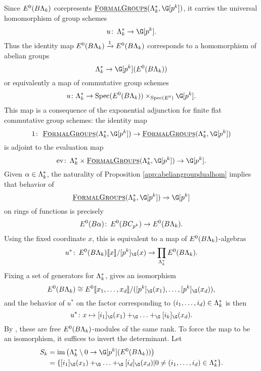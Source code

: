 Since $E^0(B\Lambda_k)$ corepresents $\InternalHom{FormalGroups}(\Lk^*,\G[p^k])$, it carries the universal homomorphism of group schemes
\[
u \co \Lk^* \rightarrow \G[p^k].
\]
Thus the identity map $E^0(B\Lambda_k) \xrightarrow{1} E^0(B\Lambda_k)$ corresponds to a homomorphism of abelian groups
\[
\Lk^* \rightarrow \G[p^k](E^0(B\Lk))
\]
or equivalently a map of commutative group schemes
\[
u \colon \Lk^* \rightarrow \Spec(E^0(B\Lk)) \times_{\Spec(E^0)} \G[p^k].
\]
This map is a consequence of the exponential adjunction for finite flat commutative group schemes: the identity map
\[
1 \co \InternalHom{FormalGroups}(\Lk^*,\G[p^k]) \to \InternalHom{FormalGroups}(\Lk^*,\G[p^k])
\]
is adjoint to the evaluation map
\[
\mathrm{ev} \co \Lk^* \times  \InternalHom{FormalGroups}(\Lk^*,\G[p^k]) \to \G[p^k].
\]
Given $\alpha \in \Lambda_k^*$, the naturality of Proposition \ref{app:abeliangroupdualhom} implies that behavior of
\[
\InternalHom{FormalGroups}(\Lk^*,\G[p^k]) \to \G[p^k]
\]
on rings of functions is precisely
\begin{equation}
E^0(B\alpha) \colon\thinspace E^0(BC_{p^k}) \to E^0(B\Lambda_k).
\end{equation}
Using the fixed coordinate $x$, this is equivalent to a map of $E^0(B\Lambda_k)$-algebras
\begin{equation}
u^* \co E^0(B\Lk)\ps{x}/[p^k]_{\G}(x) \xrightarrow{} \prod_{\Lk^*} E^0(B\Lk).
\end{equation}
Fixing a set of generators for $\Lambda_k^*$, gives an isomorphism
\[
E^0(B\Lk) \cong E^0\ps{x_1, \ldots, x_d}/([p^k]_{\G}(x_1), \ldots, [p^k]_{\G}(x_d)),
\]
and the behavior of $u^*$ on the factor corresponding to $(i_1, \ldots, i_d) \in \Lambda_k^*$ is then
\[
u^* \colon x \mapsto [i_1]_{\G}(x_1)+_{\G} \ldots +_{\G} [i_k]_{\G}(x_d).
\]
By , these are free $E^0(B\Lambda_k)$-modules of the same rank. To force the map to be an isomorphism, it suffices to invert the determinant. Let
\begin{align*}
S_k &= \im \big (\Lk^* \setminus 0 \rightarrow \G[p^k](E^0(B\Lk)) \big ) \\ &= \{ [i_1]_{\G}(x_1)+_{\G} \ldots +_{\G} [i_d]_{\G}(x_d)| 0 \neq (i_1, \ldots, i_d) \in \Lk^* \}.
\end{align*}

